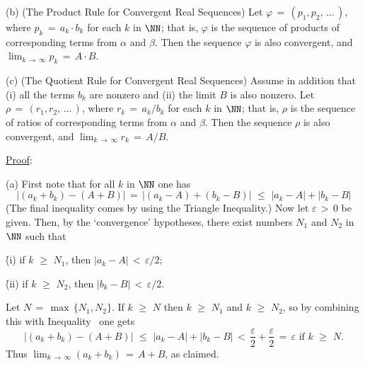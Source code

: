 \V

        (b) (The Product Rule for Convergent Real Sequences) Let ${\varphi} \,=\,(p_{1},p_{2},\,{\ldots}\,)$, where $p_{k} \,=\,a_{k}{\cdot}b_{k}$ for each $k$ in ${\NN}$;
    that is, ${\varphi}$ is the sequence of products of corresponding terms from ${\alpha}$ and ${\beta}$.
    Then the sequence ${\varphi}$ is also convergent, and $\lim_{k \,{\rightarrow}\, {\infty}} p_{k} \,=\, A{\cdot}B$.

\V

        (c) (The Quotient Rule for Convergent Real Sequences) Assume in addition that (i) all the terms $b_{k}$ are nonzero and (ii) the limit $B$ is also nonzero.
    Let ${\rho} \,=\,(r_{1},r_{2},\,{\ldots}\,)$, where $r_{k} \,=\,a_{k}/b_{k}$ for each $k$ in ${\NN}$;
    that is, ${\rho}$ is the sequence of ratios of corresponding terms from ${\alpha}$ and ${\beta}$.
    Then the sequence ${\rho}$ is also convergent, and $\lim_{k \,{\rightarrow}\, {\infty}} r_{k} \,=\, A/B$.

\V

        \underline{Proof}:

\V

        (a) First note that for all $k$ in ${\NN}$ one has
        \begin{equation} 
        \label{IneqC.70}
        |(a_{k}+b_{k})-(A+B)| \,=\, |(a_{k}-A) + (b_{k}-B)|\,\,{\leq}\,\,|a_{k}-A| + |b_{k}-B|
        \end{equation}
    (The final inequality comes by using the Triangle Inequality.)
    Now let ${\varepsilon}\,>\,0$ be given.
    Then, by the `convergence' hypotheses, there exist numbers $N_{1}$ and $N_{2}$ in ${\NN}$ such that

        \h (i) if $k\,\,{\geq}\,\,N_{1}$,  then $|a_{k}-A|\,<\,{\varepsilon}/2$;

        \h (ii) if $k\,\,{\geq}\,\,N_{2}$, then $|b_{k}-B|\,<\,{\varepsilon}/2$.

\noindent  Let $N \,=\, \max\,\{N_{1},N_{2}\}$. If $k\,\,{\geq}\,\,N$ then $k\,\,{\geq}\,\,N_{1}$ and $k\,\,{\geq}\,\,N_{2}$,
    so by combining this with Inequality~ one gets
        \begin{displaymath}
        |(a_{k}+b_{k})-(A+B)|\,\,{\leq}\,\,|a_{k}-A| + |b_{k}-B|\,<\,\frac{{\varepsilon}}{2} + \frac{{\varepsilon}}{2} \,=\, {\varepsilon} \mbox{ if $k\,\,{\geq}\,\,N$}.
        \end{displaymath}
    Thus $\lim_{k \,{\rightarrow}\, {\infty}} (a_{k}+b_{k}) \,=\, A+B$, as claimed.

